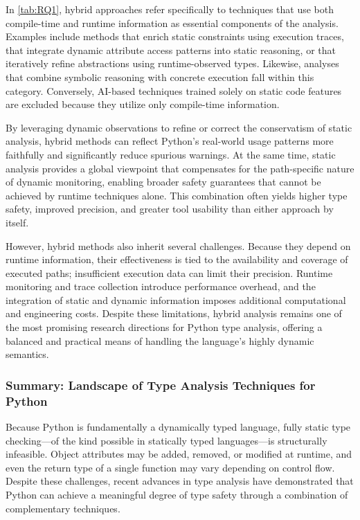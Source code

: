In \autoref{tab:RQ1}, hybrid approaches refer specifically to techniques that
use both compile-time and runtime information as essential components of the
analysis.
Examples include methods that enrich static constraints using execution traces,
that integrate dynamic attribute access patterns into static reasoning, or that
iteratively refine abstractions using runtime-observed types.
Likewise, analyses that combine symbolic reasoning with concrete execution fall
within this category.
Conversely, AI-based techniques trained solely on static code features are
excluded because they utilize only compile-time information.

By leveraging dynamic observations to refine or correct the conservatism of
static analysis, hybrid methods can reflect Python’s real-world usage patterns
more faithfully and significantly reduce spurious warnings.
At the same time, static analysis provides a global viewpoint that compensates
for the path-specific nature of dynamic monitoring, enabling broader safety
guarantees that cannot be achieved by runtime techniques alone.
This combination often yields higher type safety, improved precision, and
greater tool usability than either approach by itself.

However, hybrid methods also inherit several challenges.
Because they depend on runtime information, their effectiveness is tied to the
availability and coverage of executed paths; insufficient execution data can
limit their precision.
Runtime monitoring and trace collection introduce performance overhead, and the
integration of static and dynamic information imposes additional computational
and engineering costs. Despite these limitations, hybrid analysis remains one
of the most promising research directions for Python type analysis, offering a
balanced and practical means of handling the language’s highly dynamic
semantics.

\subsubsection{\textbf{Summary: Landscape of Type Analysis Techniques for Python}}
Because Python is fundamentally a dynamically typed language, fully static type
checking—of the kind possible in statically typed languages—is structurally
infeasible.
Object attributes may be added, removed, or modified at runtime, and even the
return type of a single function may vary depending on control flow.
Despite these challenges, recent advances in type analysis have demonstrated
that Python can achieve a meaningful degree of type safety through a
combination of complementary techniques.

